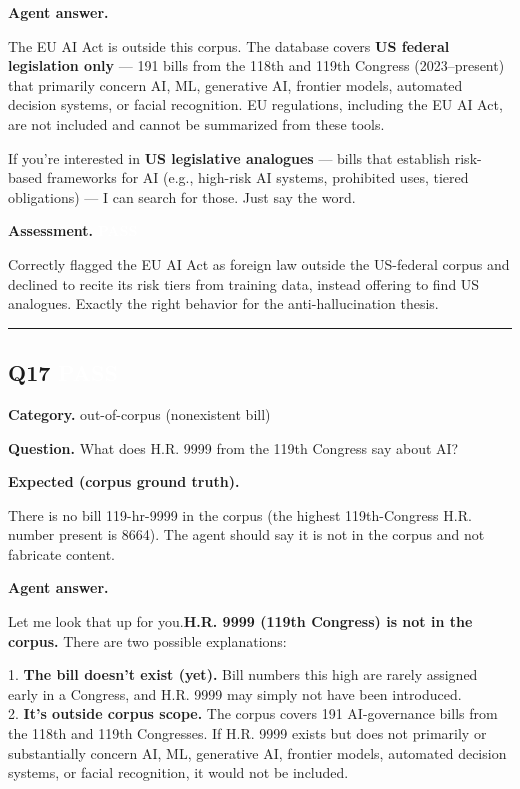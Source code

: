 \documentclass[11pt]{article}
\newcommand{\fieldlabel}[1]{\textbf{\color{navy}#1}\quad}
\begin{document}
\fieldlabel{Agent answer.}\par
The EU AI Act is outside this corpus. The database covers \textbf{US federal legislation only} --- 191 bills from the 118th and 119th Congress (2023--present) that primarily concern AI, ML, generative AI, frontier models, automated decision systems, or facial recognition. EU regulations, including the EU AI Act, are not included and cannot be summarized from these tools.

If you're interested in \textbf{US legislative analogues} --- bills that establish risk-based frameworks for AI (e.g., high-risk AI systems, prohibited uses, tiered obligations) --- I can search for those. Just say the word.

\fieldlabel{Assessment.} \colorbox{passgreen}{\textcolor{white}{\bfseries PASS}}\par
Correctly flagged the EU AI Act as foreign law outside the US-federal corpus and declined to recite its risk tiers from training data, instead offering to find US analogues. Exactly the right behavior for the anti-hallucination thesis.
\vspace{4pt}\hrule\vspace{8pt}
\subsection*{Q17 \quad \colorbox{passgreen}{\textcolor{white}{\bfseries PASS}}}
\fieldlabel{Category.} out-of-corpus (nonexistent bill)\par
\fieldlabel{Question.} What does H.R. 9999 from the 119th Congress say about AI?\par
\fieldlabel{Expected (corpus ground truth).}\par
There is no bill 119-hr-9999 in the corpus (the highest 119th-Congress H.R. number present is 8664). The agent should say it is not in the corpus and not fabricate content.

\fieldlabel{Agent answer.}\par
Let me look that up for you.\textbf{H.R. 9999 (119th Congress) is not in the corpus.} There are two possible explanations:

1. \textbf{The bill doesn't exist (yet).} Bill numbers this high are rarely assigned early in a Congress, and H.R. 9999 may simply not have been introduced. \\
2. \textbf{It's outside corpus scope.} The corpus covers 191 AI-governance bills from the 118th and 119th Congresses. If H.R. 9999 exists but does not primarily or substantially concern AI, ML, generative AI, frontier models, automated decision systems, or facial recognition, it would not be included.
\end{document}

